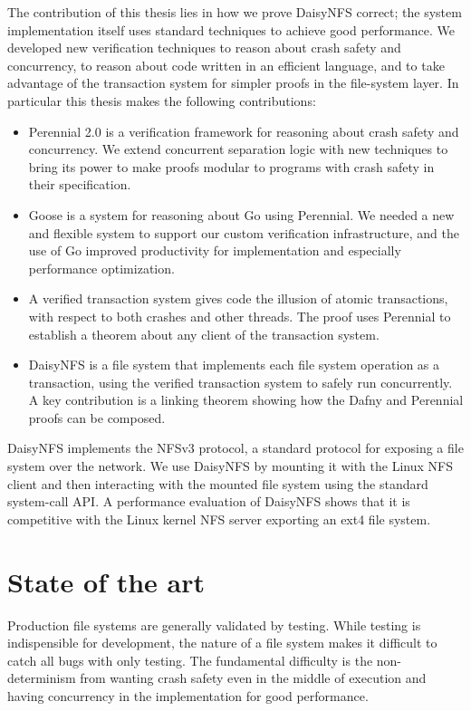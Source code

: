The contribution of this thesis lies in how we prove DaisyNFS correct; the
system implementation itself uses standard techniques to achieve good
performance. We developed new verification techniques to reason about crash
safety and concurrency, to reason about code written in an efficient language,
and to take advantage of the transaction system for simpler proofs in the
file-system layer. In particular this thesis makes the following contributions:
\begin{itemize}
  \item Perennial 2.0 is a verification framework for reasoning about crash
  safety and concurrency. We extend concurrent separation logic with new
  techniques to bring its power to make proofs modular to programs with crash
  safety in their specification.
  \item Goose is a system for reasoning about Go using Perennial. We needed a
  new and flexible system to support our custom verification infrastructure, and
  the use of Go improved productivity for implementation and especially
  performance optimization.
  \item A verified transaction system gives code the
  illusion of atomic transactions, with respect to both crashes and other
  threads. The proof uses Perennial to establish a theorem about any client of the
  transaction system.
  \item DaisyNFS is a file system that implements each file system operation as
  a transaction, using the verified transaction system to safely run
  concurrently. A key contribution is a linking theorem showing how
  the Dafny and Perennial proofs can be composed.
\end{itemize}

DaisyNFS implements the NFSv3 protocol, a standard protocol for exposing
a file system over the network. We use DaisyNFS by mounting it with the
Linux NFS client and then interacting with the mounted file system using
the standard system-call API. A performance evaluation of DaisyNFS shows
that it is competitive with the Linux kernel NFS server exporting an
ext4 file system.

\section{State of the art}

Production file systems are generally validated by testing. While testing is
indispensible for development, the nature of a file system makes it difficult to
catch all bugs with only testing. The fundamental difficulty is the
non-determinism from wanting crash safety even in the middle of execution and
having concurrency in the implementation for good performance.

